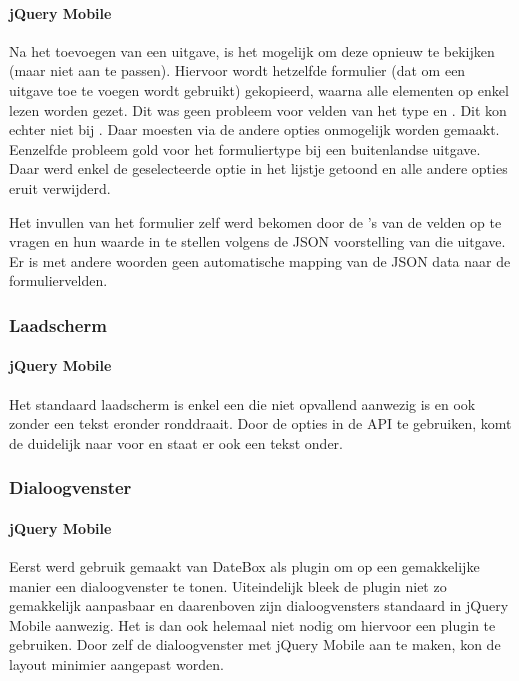 \paragraph{jQuery Mobile} 
Na het toevoegen van een uitgave, is het mogelijk om deze opnieuw te bekijken (maar niet aan te passen).
Hiervoor wordt hetzelfde formulier (dat om een uitgave toe te voegen wordt gebruikt) gekopieerd, waarna alle elementen op enkel lezen worden gezet.
Dit was geen probleem voor velden van het type  en . 
Dit kon echter niet  bij . 
Daar moesten via  de andere opties onmogelijk worden gemaakt.
Eenzelfde probleem gold voor het  formuliertype bij een buitenlandse uitgave.
Daar werd enkel de geselecteerde optie in het lijstje getoond en alle andere opties eruit verwijderd.

Het invullen van het formulier zelf werd bekomen door de 's van de velden op te vragen en hun waarde in te stellen volgens de JSON voorstelling van die uitgave. 
Er is met andere woorden geen automatische mapping van de JSON data naar de formuliervelden. 

\subsubsection{Laadscherm}

\paragraph{jQuery Mobile} 
Het standaard laadscherm is enkel een  die niet opvallend aanwezig is en ook zonder een tekst eronder ronddraait.
Door de opties in de API te gebruiken, komt de  duidelijk naar voor en staat er ook een tekst onder.

\subsubsection{Dialoogvenster}

\paragraph{jQuery Mobile} 
Eerst werd gebruik gemaakt van DateBox \cite{Sage2013} als plugin om op een gemakkelijke manier een dialoogvenster te tonen.
Uiteindelijk bleek de plugin niet zo gemakkelijk aanpasbaar en daarenboven zijn dialoogvensters standaard in jQuery Mobile aanwezig.
Het is dan ook helemaal niet nodig om hiervoor een plugin te gebruiken.
Door zelf de dialoogvenster met jQuery Mobile aan te maken, kon de layout minimier aangepast worden.

